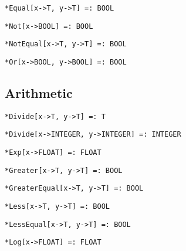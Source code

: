 \protect \large \begin{verbatim}
*Equal[x->T, y->T] =: BOOL
\end{verbatim}\normalsize


\protect \large \begin{verbatim}
*Not[x->BOOL] =: BOOL
\end{verbatim}\normalsize


\protect \large \begin{verbatim}
*NotEqual[x->T, y->T] =: BOOL
\end{verbatim}\normalsize


\protect \large \begin{verbatim}
*Or[x->BOOL, y->BOOL] =: BOOL
\end{verbatim} \normalsize


\medskip
\subsection{Arithmetic}


\protect \large \begin{verbatim}
*Divide[x->T, y->T] =: T
\end{verbatim} \normalsize


\protect \large \begin{verbatim}
*Divide[x->INTEGER, y->INTEGER] =: INTEGER
\end{verbatim} \normalsize


\protect \large \begin{verbatim}
*Exp[x->FLOAT] =: FLOAT
\end{verbatim} \normalsize


\protect \large \begin{verbatim}
*Greater[x->T, y->T] =: BOOL
\end{verbatim}\normalsize


\protect \large \begin{verbatim}
*GreaterEqual[x->T, y->T] =: BOOL
\end{verbatim}\normalsize


\protect \large \begin{verbatim}
*Less[x->T, y->T] =: BOOL
\end{verbatim}\normalsize


\protect \large \begin{verbatim}
*LessEqual[x->T, y->T] =: BOOL
\end{verbatim}\normalsize


\protect \large \begin{verbatim}
*Log[x->FLOAT] =: FLOAT
\end{verbatim} \normalsize


